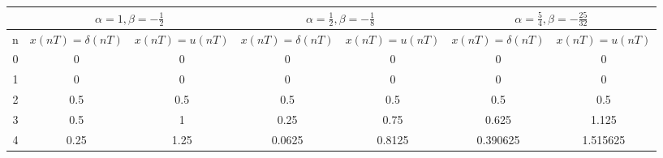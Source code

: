\begin{table}[H]
    \centering
    \begin{tabular}{c|cccccc|}
    \cline{2-7}
                             & \multicolumn{2}{c|}{\cellcolor[HTML]{C0C0C0}$\alpha  = 1, \beta = -\frac{1}{2}$}  & \multicolumn{2}{c|}{\cellcolor[HTML]{C0C0C0}$\alpha  = \frac{1}{2}, \beta = -\frac{1}{8}$} & \multicolumn{2}{c|}{\cellcolor[HTML]{C0C0C0}$\alpha  = \frac{5}{4}, \beta = -\frac{25}{32}$} \\ \hline
    \multicolumn{1}{|c|}{n}  & \multicolumn{1}{c|}{$x(nT) = \delta (nT)$} & \multicolumn{1}{c|}{$x(nT) = u(nT)$} & \multicolumn{1}{c|}{$x(nT) = \delta (nT)$}      & \multicolumn{1}{c|}{$x(nT) = u(nT)$}     & \multicolumn{1}{c|}{$x(nT) = \delta (nT)$}                 & $x(nT) = u(nT)$                 \\ \hline
    \multicolumn{1}{|c|}{0}  & 0                                          & 0                                    & 0                                               & 0                                        & 0                                                          & 0                               \\ \cline{1-1}
    \multicolumn{1}{|c|}{1}  & 0                                          & 0                                    & 0                                               & 0                                        & 0                                                          & 0                               \\ \cline{1-1}
    \multicolumn{1}{|c|}{2}  & 0.5                                        & 0.5                                  & 0.5                                             & 0.5                                      & 0.5                                                        & 0.5                             \\ \cline{1-1}
    \multicolumn{1}{|c|}{3}  & 0.5                                        & 1                                    & 0.25                                            & 0.75                                     & 0.625                                                      & 1.125                           \\ \cline{1-1}
    \multicolumn{1}{|c|}{4}  & 0.25                                       & 1.25                                 & 0.0625                                          & 0.8125                                   & 0.390625                                                   & 1.515625                        \\ \cline{1-1}

\end{tabular}
\end{table}
